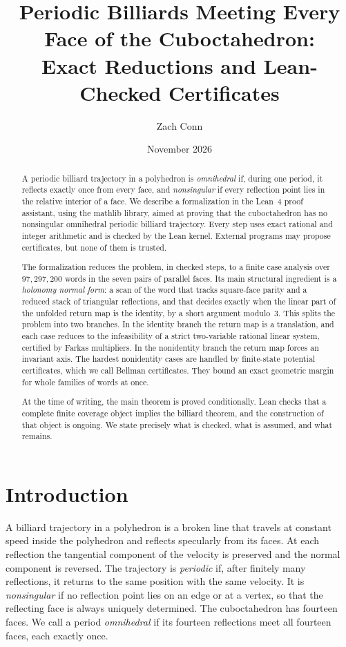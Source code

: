 \documentclass[11pt]{article}
\title{Periodic Billiards Meeting Every Face of the Cuboctahedron:\\
Exact Reductions and Lean-Checked Certificates}
\author{Zach Conn}
\date{November 2026}
\begin{document}
\maketitle

\begin{abstract}
A periodic billiard trajectory in a polyhedron is \emph{omnihedral} if, during
one period, it reflects exactly once from every face, and \emph{nonsingular}
if every reflection point lies in the relative interior of a face.  We
describe a formalization in the Lean~4 proof assistant, using the mathlib
library, aimed at proving that the cuboctahedron has no nonsingular
omnihedral periodic billiard trajectory.  Every step uses exact rational and
integer arithmetic and is checked by the Lean kernel.  External programs may
propose certificates, but none of them is trusted.

The formalization reduces the problem, in checked steps, to a finite case
analysis over $97{,}297{,}200$ words in the seven pairs of parallel faces.
Its main structural ingredient is a \emph{holonomy normal form}: a scan of
the word that tracks square-face parity and a reduced stack of triangular
reflections, and that decides exactly when the linear part of the unfolded
return map is the identity, by a short argument modulo~$3$.  This splits the
problem into two branches.  In the identity branch the return map is a
translation, and each case reduces to the infeasibility of a strict
two-variable rational linear system, certified by Farkas multipliers.  In the
nonidentity branch the return map forces an invariant axis.  The hardest
nonidentity cases are handled by finite-state potential certificates, which
we call Bellman certificates.  They bound an exact geometric margin for whole
families of words at once.

At the time of writing, the main theorem is proved conditionally.  Lean
checks that a complete finite coverage object implies the billiard theorem,
and the construction of that object is ongoing.  We state precisely what is
checked, what is assumed, and what remains.
\end{abstract}

\section{Introduction}

A billiard trajectory in a polyhedron is a broken line that travels at
constant speed inside the polyhedron and reflects specularly from its faces.
At each reflection the tangential component of the velocity is preserved and
the normal component is reversed.  The trajectory is \emph{periodic} if, after
finitely many reflections, it returns to the same position with the same
velocity.  It is \emph{nonsingular} if no reflection point lies on an edge or
at a vertex, so that the reflecting face is always uniquely determined.  The
cuboctahedron has fourteen faces.  We call a period \emph{omnihedral} if its
fourteen reflections meet all fourteen faces, each exactly once.
\end{document}
